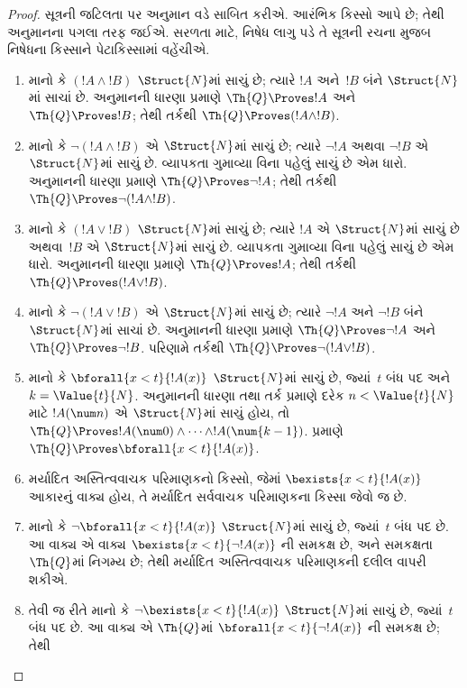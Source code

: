 \begin{proof}
સૂત્રની જટિલતા પર
અનુમાન વડે સાબિત કરીએ.
આરંભિક કિસ્સો
આપે છે; તેથી અનુમાનના
પગલા તરફ જઈએ. સરળતા માટે,
નિષેધ લાગુ પડે તે
સૂત્રની રચના મુજબ
નિષેધના કિસ્સાને પેટાકિસ્સામાં
વહેંચીએ.

\begin{enumerate}
\item માનો કે $(!A \land !B)$
$\Struct{N}$માં સાચું છે;
ત્યારે $!A$ અને~$!B$ બંને
$\Struct{N}$માં સાચાં છે.
અનુમાનની ધારણા પ્રમાણે
$\Th{Q} \Proves !A$ અને
$\Th{Q} \Proves !B$;
તેથી તર્કથી
$\Th{Q} \Proves (!A \land !B)$.
\item માનો કે
$\lnot (!A \land !B)$ એ
$\Struct{N}$માં સાચું છે;
ત્યારે $\lnot !A$ અથવા
$\lnot !B$ એ $\Struct{N}$માં
સાચું છે. વ્યાપકતા ગુમાવ્યા
વિના પહેલું સાચું છે એમ
ધારો. અનુમાનની ધારણા પ્રમાણે
$\Th{Q} \Proves \lnot !A$;
તેથી તર્કથી $\Th{Q} \Proves
\lnot (!A \land !B)$.
\item માનો કે $(!A \lor !B)$
$\Struct{N}$માં સાચું છે;
ત્યારે $!A$ એ $\Struct{N}$માં
સાચું છે અથવા~$!B$ એ
$\Struct{N}$માં સાચું છે.
વ્યાપકતા ગુમાવ્યા વિના પહેલું
સાચું છે એમ ધારો.
અનુમાનની ધારણા પ્રમાણે
$\Th{Q} \Proves !A$;
તેથી તર્કથી $\Th{Q} \Proves
(!A \lor !B)$.
\item માનો કે
$\lnot(!A \lor !B)$ એ
$\Struct{N}$માં સાચું છે;
ત્યારે $\lnot !A$ અને
$\lnot !B$ બંને $\Struct{N}$માં
સાચાં છે. અનુમાનની ધારણા
પ્રમાણે $\Th{Q} \Proves
\lnot !A$ અને
$\Th{Q} \Proves \lnot !B$.
પરિણામે તર્કથી
$\Th{Q} \Proves
\lnot(!A \lor !B)$.
\item માનો કે
$\bforall{x<t}{!A(x)}$
$\Struct{N}$માં સાચું છે,
જ્યાં~$t$ બંધ પદ અને
$k=\Value{t}{N}$. અનુમાનની
ધારણા તથા તર્ક પ્રમાણે
દરેક $n < \Value{t}{N}$
માટે $!A(\num n)$ એ
$\Struct{N}$માં સાચું હોય,
તો $\Th{Q} \Proves
!A(\num 0) \land \dots \land !A(\num{k-1})$.
પ્રમાણે $\Th{Q} \Proves
\bforall{x<t}{!A(x)}$.
\item મર્યાદિત અસ્તિત્વવાચક
પરિમાણકનો કિસ્સો, જેમાં
$\bexists{x < t}{!A(x)}$
આકારનું વાક્ય હોય,
તે મર્યાદિત સર્વવાચક
પરિમાણકના કિસ્સા જેવો જ છે.
\item માનો કે
$\lnot \bforall{x<t}{!A(x)}$
$\Struct{N}$માં સાચું છે,
જ્યાં~$t$ બંધ પદ છે.
આ વાક્ય એ
વાક્ય
$\bexists{x<t}{\lnot !A(x)}$
ની સમકક્ષ છે, અને સમકક્ષતા
$\Th{Q}$માં નિગમ્ય છે;
તેથી મર્યાદિત અસ્તિત્વવાચક
પરિમાણકની દલીલ વાપરી શકીએ.
\item તેવી જ રીતે માનો કે
$\lnot \bexists{x<t}{!A(x)}$
$\Struct{N}$માં સાચું છે,
જ્યાં~$t$ બંધ પદ છે.
આ વાક્ય એ
$\Th{Q}$માં
$\bforall{x<t}{\lnot!A(x)}$
ની સમકક્ષ છે; તેથી

\end{enumerate}
\end{proof}

